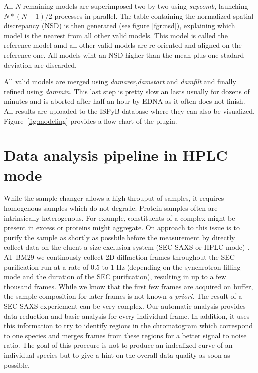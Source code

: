 \documentclass[preprint,pdf]{iucr}              %
\begin{document}
All $N$ remaining models are superimposed two by two using
\textit{supcomb}\cite{supcomb}, launching $N*(N-1)/2$ processes in parallel.
The table containing the normalized spatial discrepancy (NSD) is then generated
(see figure \ref{fgr:nsd}), explaining which model is the nearest from all other
valid models. This model is called the reference model amd all other valid
models are re-oriented and aligned on the reference one. All models wiht an NSD higher than the mean plus one stadard deviation are discarded.


All valid models are merged using \textit{damaver}\cite{damaver},\textit{damstart} and
\textit{damfilt} and finally refined using \textit{dammin}\cite{dammin}.
This last step is pretty slow an lasts usually for dozens of minutes and is
aborted after half an hour by EDNA as it often does not finish. All results are
uploaded to the ISPyB database where they can also be visualized. Figure~\ref{fig:modeling} provides a flow chart of the plugin.


\section{Data analysis pipeline in HPLC mode}
While the sample changer allows a high throuput of samples, it requires homogenous samples which do not degrade. Protein samples often are intrinsically heterogenous. For example, constituents of a complex might be present in excess or proteins might aggregate. On approach to this issue is to purify the sample as shortly as possbile before the measurement by directly collect data on the eluent a size exclusion system (SEC-SAXS or HPLC mode) \cite{SECBM29,otherSEC}. AT BM29 we continously collect 2D-diffraction frames throughout the SEC purification run at a rate of 0.5 to 1 Hz (depending on the synchrotron filling mode and the duration of the SEC purification), resulting in up to a few thousand frames. While we know that the first few frames are acquired on buffer, the sample composition for later frames is not known \textit{a priori}. The result of a SEC-SAXS experiement can be very complex. Our automatic analysis provides data reduction and basic analysis for every individual frame. In addition, it uses this information to try to identify regions in the chromatogram which correspond to one species and merges frames from these regions for a better signal to noise ratio. The goal of this proceure is not to produce an indealized curve of an individual species but to give a hint on the overall data quality as soon as possible.
\end{document}
